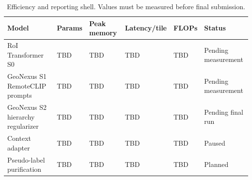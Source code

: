 \begin{table}[t]
\centering
\small
\caption{Efficiency and reporting shell. Values must be measured before final submission.}
\label{tab:efficiency_reporting}
\begin{tabular}{llllll}
\toprule
Model & Params & Peak memory & Latency/tile & FLOPs & Status \\
\midrule
RoI Transformer S0 & TBD & TBD & TBD & TBD & Pending measurement \\
GeoNexus S1 RemoteCLIP prompts & TBD & TBD & TBD & TBD & Pending measurement \\
GeoNexus S2 hierarchy regularizer & TBD & TBD & TBD & TBD & Pending final run \\
Context adapter & TBD & TBD & TBD & TBD & Paused \\
Pseudo-label purification & TBD & TBD & TBD & TBD & Planned \\
\bottomrule
\end{tabular}
\end{table}

